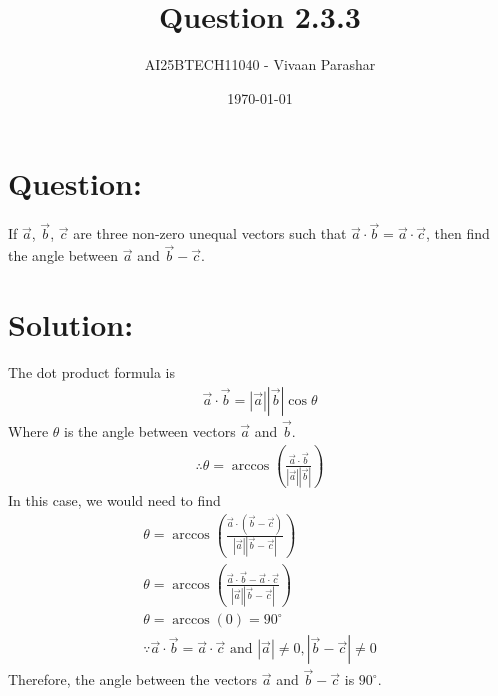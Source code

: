 \documentclass[a4paper, 12pt]{article}
\title{Question 2.3.3}
\author{AI25BTECH11040 - Vivaan Parashar}
\date{\today}
\begin{document}
\maketitle

\section{Question: }
If $\vec{a}$, $\vec{b}$, $\vec{c}$ are three non-zero unequal vectors such that $\vec{a}\cdot\vec{b} = \vec{a}\cdot\vec{c}$, then find the angle between $\vec{a}$ and $\vec{b}-\vec{c}$.

\section{Solution: }
The dot product formula is
\begin{align}
    \vec{a}\cdot\vec{b} = |\vec{a}||\vec{b}|\cos\theta
\end{align} Where $\theta$ is the angle between vectors $\vec{a}$ and $\vec{b}$.
\begin{align}
    \therefore\theta = \arccos(\frac{\vec{a}\cdot\vec{b}}{|\vec{a}||\vec{b}|})
\end{align}
In this case, we would need to find
\begin{align}
    \theta = \arccos(\frac{\vec{a}\cdot(\vec{b}-\vec{c})}{|\vec{a}||\vec{b}-\vec{c}|})\\
    \theta = \arccos(\frac{\vec{a}\cdot\vec{b}-\vec{a}\cdot\vec{c}}{|\vec{a}||\vec{b}-\vec{c}|})\\
    \theta = \arccos(0) = 90^\circ\\
    \because \vec{a}\cdot\vec{b}=\vec{a}\cdot\vec{c} \text{ and } |\vec{a}| \ne 0, |\vec{b}-\vec{c}| \ne 0
\end{align}
Therefore, the angle between the vectors $\vec{a}$ and $\vec{b}-\vec{c}$ is $90^\circ$.
\end{document}
